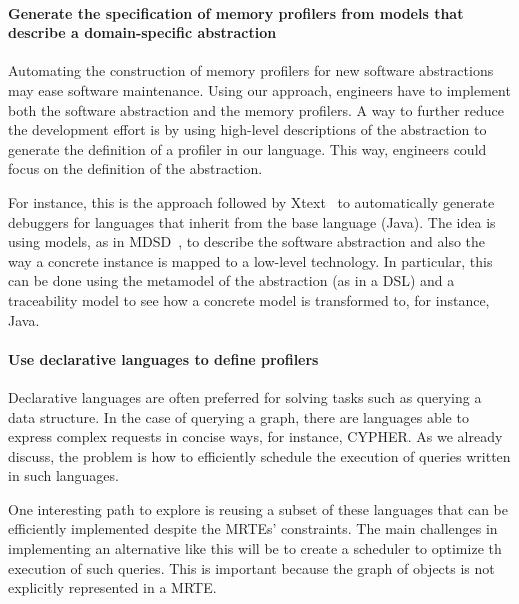 \paragraph{Generate the specification of memory profilers from models that describe a domain-specific abstraction}
Automating the construction of memory profilers for new software abstractions may ease software maintenance.
Using our approach, engineers have to implement both the software abstraction and the memory profilers.
A way to further reduce the development effort is by using high-level descriptions of the abstraction to generate the definition of a profiler in our language.
This way, engineers could focus on the definition of the abstraction. 

For instance, this is the approach followed by Xtext~\cite{Eysholdt:2010:XIY:1869542.1869625} to automatically generate debuggers for languages that inherit from the base language (Java).
The idea is using models, as in \gls{MDSD}~\cite{Stahl:2006:MSD:1196766, Fowler:2010:DSL:1809745}, to describe the software abstraction and also the way a concrete instance is mapped to a low-level technology.
In particular, this can be done using the metamodel of the abstraction (as in a DSL) and a traceability model to see how a concrete model is transformed to, for instance, Java.

\paragraph{Use declarative languages to define profilers}
Declarative languages are often preferred for solving tasks such as querying a data structure.
In the case of querying a graph, there are languages able to express complex requests in concise ways, for instance, CYPHER.
As we already discuss, the problem is how to efficiently schedule the execution of queries written in such languages.

One interesting path to explore is reusing a subset of these languages that can be efficiently implemented despite the MRTEs' constraints.
The main challenges in implementing an alternative like this will be to create a scheduler to optimize th execution of such queries.
This is important because the graph of objects is not explicitly represented in a MRTE.


